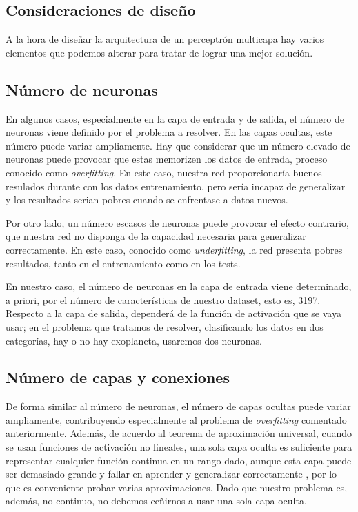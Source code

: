 

\subsection{Consideraciones de diseño}\label{consideraciones-de-diseno}

A la hora de diseñar la arquitectura de un perceptrón multicapa hay
varios elementos que podemos alterar para tratar de lograr una mejor
solución.

\subsection{Número de neuronas}\label{numero-de-neuronas}

En algunos casos, especialmente en la capa de entrada y de salida, el
número de neuronas viene definido por el problema a resolver. En las
capas ocultas, este número puede variar ampliamente. Hay que considerar
que un número elevado de neuronas puede provocar que estas memorizen los
datos de entrada, proceso conocido como \emph{overfitting}. En este
caso, nuestra red proporcionaría buenos resulados durante con los datos
entrenamiento, pero sería incapaz de generalizar y los resultados serian
pobres cuando se enfrentase a datos nuevos.

Por otro lado, un número escasos de neuronas puede provocar el efecto
contrario, que nuestra red no disponga de la capacidad necesaria para
generalizar correctamente. En este caso, conocido como
\emph{underfitting}, la red presenta pobres resultados, tanto en el
entrenamiento como en los tests.

En nuestro caso, el número de neuronas en la capa de entrada viene
determinado, a priori, por el número de características de nuestro
dataset, esto es, 3197. Respecto a la capa de salida, dependerá de la
función de activación que se vaya usar; en el problema que tratamos de
resolver, clasificando los datos en dos categorías, hay o no hay
exoplaneta, usaremos dos neuronas.

\subsection{Número de capas y
	conexiones}\label{numero-de-capas-y-conexiones}

De forma similar al número de neuronas, el número de capas ocultas puede
variar ampliamente, contribuyendo especialmente al problema de
\emph{overfitting} comentado anteriormente. Además, de acuerdo al
teorema de aproximación universal, cuando se usan funciones de
activación no lineales, una sola capa oculta es suficiente para
representar cualquier función continua en un rango dado, aunque esta
capa puede ser demasiado grande y fallar en aprender y generalizar
correctamente \cite{Goodfellow-et-al-2016}, por lo que es conveniente probar varias
aproximaciones. Dado que nuestro problema es, además, no continuo, no
debemos ceñirnos a usar una sola capa oculta.

